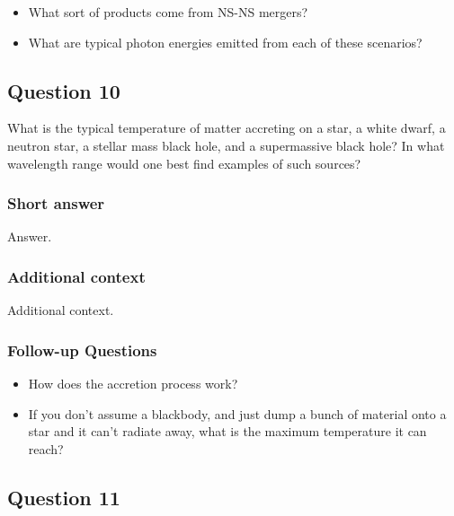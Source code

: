 \documentclass[a4paper,10pt]{article}
\begin{document}
\begin{itemize}
    \item What sort of products come from NS-NS mergers?
    \item What are typical photon energies emitted from each of these scenarios?
\end{itemize}


\newpage
\subsection{Question 10}

What is the typical temperature of matter accreting on a star, a white dwarf, a neutron star, a stellar mass black hole, and a supermassive black hole? In what wavelength range would one best find examples of such sources?

\subsubsection{Short answer}

Answer.

\subsubsection{Additional context}

Additional context.

\subsubsection{Follow-up Questions}

\begin{itemize}
    \item How does the accretion process work?
    \item If you don't assume a blackbody, and just dump a bunch of material onto a star and it can't radiate away, what is the maximum temperature it can reach?
\end{itemize}


\newpage
\subsection{Question 11}
\end{document}
